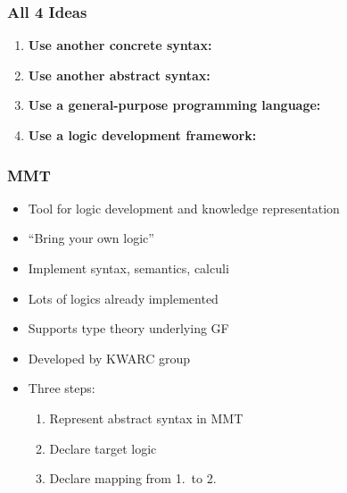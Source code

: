 \begin{frame}
    \frametitle{All 4 Ideas}
    \begin{enumerate}
        \item \textbf{Use another concrete syntax:}\par
            \gfsemconstrpic{}
        \item \textbf{Use another abstract syntax:}\par
            \def\gfsemconstrpicAST{$\text{AST}_\text{NL}$}
            \def\gfsemconstrpicArrow{\ttfamily pt -compute}
            \def\gfsemconstrpicLOG{$\text{AST}_\text{Logic}$}
            \gfsemconstrpic{}
        \pause
        \item \textbf{Use a general-purpose programming language:}\par
            \def\gfsemconstrpicAST{$\text{AST}$}
            \def\gfsemconstrpicArrow{process with}
            \def\gfsemconstrpicLOG{Haskell}
            \gfsemconstrpic{}
        \pause
        \item \textbf{Use a logic development framework:}\par
            \def\gfsemconstrpicAST{$\text{AST}$}
            \def\gfsemconstrpicArrow{process with}
            \def\gfsemconstrpicLOG{MMT}
            \gfsemconstrpic{}
    \end{enumerate}
\end{frame}


\begin{frame}
    \frametitle{MMT}
    \begin{itemize}
        \item Tool for logic development and knowledge representation
        \item ``Bring your own logic''
        \item Implement syntax, semantics, calculi
        \item Lots of logics already implemented
        \item Supports type theory underlying GF
        \item Developed by KWARC group
        \item Three steps:
            \begin{enumerate}
                \item Represent abstract syntax in MMT
                \item Declare target logic
                \item Declare mapping from 1.\ to 2.
            \end{enumerate}
    \end{itemize}
\end{frame}

